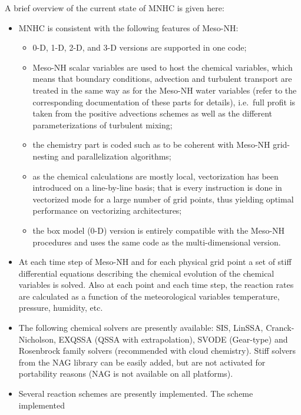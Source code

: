 A brief overview of the current state of MNHC is given here:

\begin{itemize}
\item MNHC is consistent with the following features of Meso-NH:
  \begin{itemize}
    \item 0-D, 1-D, 2-D, and 3-D versions are supported in one code;
    \item Meso-NH scalar variables are used to host the chemical variables,
          which means that boundary conditions, advection and
          turbulent transport are treated in the same way as for the
          Meso-NH water variables (refer to the corresponding documentation
          of these parts for details),
          i.e.~full profit is taken from the positive advections schemes
          as well as the different parameterizations of turbulent mixing;
    \item the chemistry part is coded such as to be coherent
          with Meso-NH grid-nesting and parallelization algorithms;
    \item as the chemical calculations are mostly local, vectorization
          has been introduced on a line-by-line basis; that is
          every instruction is done in vectorized mode for a large
          number of grid points, thus yielding optimal performance
          on vectorizing architectures;
    \item the box model (0-D) version is entirely compatible
          with the Meso-NH procedures
          and uses the same code as the multi-dimensional version.
  \end{itemize}
\item At each time step of Meso-NH and for each physical grid point
      a set of stiff differential equations describing the chemical 
      evolution of the chemical variables is solved.
      Also at each point and each time step, the reaction
      rates are calculated as a function of the meteorological variables
      temperature, pressure, humidity, etc.
\item The following chemical solvers are presently available:
      SIS, LinSSA, Cranck-Nicholson, EXQSSA (QSSA with extrapolation),
      SVODE (Gear-type) and Rosenbrock family solvers (recommended with cloud chemistry).
      Stiff solvers from the NAG library can be easily added, but are not activated
      for portability reasons (NAG is not available on all platforms).
\item Several reaction schemes are presently implemented. The scheme implemented

\end{itemize}
